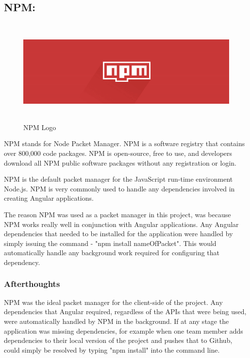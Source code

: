 \subsection{NPM:}
\label{sec:TechnologyReviewNPM}

\begin{figure}[H]
    \centering
    \includegraphics[width=\textwidth, height=150pt]{img/npmLogo.PNG}
    \caption{NPM Logo}
    \label{fig:my_label}
\end{figure}

\bigskip

NPM stands for Node Packet Manager. NPM is a software registry that contains over 800,000 code packages. NPM is open-source, free to use, and developers download all NPM public software packages without any registration or login.

NPM is the default packet manager for the JavaScript run-time environment Node.js. NPM is very commonly used to handle any dependencies involved in creating Angular applications. 

\bigskip

The reason NPM was used as a packet manager in this project, was because NPM works really well in conjunction with Angular applications. Any Angular dependencies that needed to be installed for the application were handled by simply issuing the command - "npm install nameOfPacket". This would automatically handle any background work required for configuring that dependency. 

\subsubsection{Afterthoughts}

NPM was the ideal packet manager for the client-side of the project. Any dependencies that Angular required, regardless of the APIs that were being used, were automatically handled by NPM in the background. If at any stage the application was missing dependencies, for example when one team member adds dependencies to their local version of the project and pushes that to Github, could simply be resolved by typing "npm install" into the command line.
\bigskip


